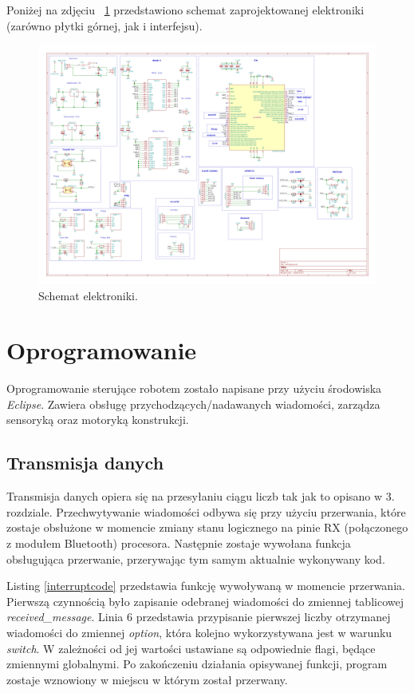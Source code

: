Poniżej na zdjęciu ~\ref{fig:electric_scheme} przedstawiono schemat zaprojektowanej elektroniki (zarówno płytki górnej, jak i interfejsu).
\begin{landscape}
\begin{figure}[ht]
	\centering
		\includegraphics[width=0.8\linewidth]{pic04/electricscheme.pdf}
	\caption{Schemat elektroniki.}
	\label{fig:electric_scheme}	
\end{figure}
\end{landscape}

\section{Oprogramowanie}
Oprogramowanie sterujące robotem zostało napisane przy użyciu środowiska \textit{Eclipse}. Zawiera obsługę przychodzących/nadawanych wiadomości, zarządza sensoryką oraz motoryką konstrukcji. 

\subsection{Transmisja danych}
Transmisja danych opiera się na przesyłaniu ciągu liczb tak jak to opisano w 3. rozdziale. Przechwytywanie wiadomości odbywa się przy użyciu przerwania, które zostaje obsłużone w momencie zmiany stanu logicznego na pinie RX (połączonego z modułem Bluetooth) procesora. Następnie zostaje wywołana funkcja obsługująca przerwanie, przerywając tym samym aktualnie wykonywany kod. 

Listing \ref{interruptcode} przedstawia funkcję wywoływaną w momencie przerwania. Pierwszą czynnością było zapisanie odebranej wiadomości do zmiennej tablicowej \textit{received\_message}. Linia 6 przedstawia przypisanie pierwszej liczby otrzymanej wiadomości do zmiennej \textit{option}, która kolejno wykorzystywana jest w warunku \textit{switch}. W zależności od jej wartości ustawiane są odpowiednie flagi, będące zmiennymi globalnymi. Po zakończeniu działania opisywanej funkcji, program zostaje wznowiony w miejscu w którym został przerwany. 


